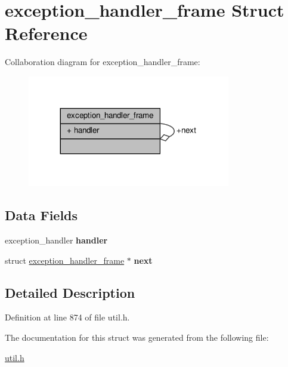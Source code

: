 \hypertarget{structexception__handler__frame}{}\section{exception\+\_\+handler\+\_\+frame Struct Reference}
\label{structexception__handler__frame}


Collaboration diagram for exception\+\_\+handler\+\_\+frame\+:
\nopagebreak
\begin{figure}[H]
\begin{center}
\leavevmode
\includegraphics[width=251pt]{structexception__handler__frame__coll__graph}
\end{center}
\end{figure}
\subsection*{Data Fields}
\begin{DoxyCompactItemize}
\item 
\mbox{\label{structexception__handler__frame_a9df815cc8cec8aace242043b89fb44e8}} 
exception\+\_\+handler {\bfseries handler}
\item 
\mbox{\label{structexception__handler__frame_a407cf31d00d01b49b1774dea464c29cf}} 
struct \hyperlink{structexception__handler__frame}{exception\+\_\+handler\+\_\+frame} $\ast$ {\bfseries next}
\end{DoxyCompactItemize}


\subsection{Detailed Description}


Definition at line 874 of file util.\+h.



The documentation for this struct was generated from the following file\+:\begin{DoxyCompactItemize}
\item 
\hyperlink{util_8h}{util.\+h}\end{DoxyCompactItemize}

